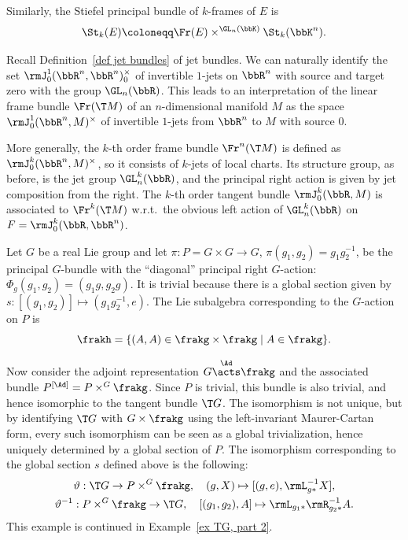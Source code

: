 \begin{example}
\begin{enumerate}
        Similarly, the Stiefel principal bundle of $k$-frames of $E$ is
        \[\St_k(E)\coloneqq \Fr(E)\times^{\GL_n(\bbK)}\St_k(\bbK^n).\]
    \end{enumerate}
\end{example}

\begin{example}
    Recall Definition~\ref{def jet bundles} of jet bundles. We can naturally identify the set $\rmJ^1_0(\bbR^n,\bbR^n)_0^\times$ of invertible $1$-jets on $\bbR^n$ with source and target zero with the group $\GL_n(\bbR)$. This leads to an interpretation of the linear frame bundle $\Fr(\T M)$ of an $n$-dimensional manifold $M$ as the space $\rmJ^1_0(\bbR^n,M)^\times$ of invertible $1$-jets from $\bbR^n$ to $M$ with source $0$.

    More generally, the $k$-th order frame bundle $\Fr^n(\T M)$ is defined as $\rmJ^k_0(\bbR^n,M)^\times$, so it consists of $k$-jets of local charts. Its structure group, as before, is the jet group $\GL^k_n(\bbR)$, and the principal right action is given by jet composition from the right. The $k$-th order tangent bundle $\rmJ^k_0(\bbR,M)$ is associated to $\Fr^k(\T M)$ w.r.t.\ the obvious left action of $\GL^k_n(\bbR)$ on $F=\rmJ^k_0(\bbR,\bbR^n)$.
\end{example}


\begin{example}\label{ex TG, part 1}
    Let $G$ be a real Lie group and let $\pi:P=G\times G\to G$, $\pi(g_1,g_2)=g_1g_2^{-1}$, be the principal $G$-bundle with the ``diagonal'' principal right $G$-action: $\Phi_g(g_1,g_2)=(g_1g,g_2g)$.  It is trivial because there is a global section given by $s:[(g_1,g_2)]\mapsto (g_1g_2^{-1},e)$. The Lie subalgebra corresponding to the $G$-action on $P$ is 
    \[\frakh=\{(A,A)\in \frakg\times\frakg\mid A\in\frakg\}.\]

    Now consider the adjoint representation $G\overset{\Ad}{\acts}\frakg$ and the associated bundle $P^{[\Ad]}=P\times^G \frakg$. Since $P$ is trivial, this bundle is also trivial, and hence isomorphic to the tangent bundle $\T G$. The isomorphism is not unique, but by identifying $\T G$ with $G\times\frakg$ using the left-invariant Maurer-Cartan form, every such isomorphism can be seen as a global trivialization, hence uniquely determined by a global section of $P$. The isomorphism corresponding to the global section $s$ defined above is the following:
    \begin{gather}
    	\vartheta: \T G\to P \times^G \frakg,\quad (g,X)\mapsto [(g,e),\rmL_{g\ast}^{-1}X],\\
    	\vartheta^{-1}: P\times^G \frakg\to \T G,\quad [(g_1,g_2),A]\mapsto \rmL_{g_1\ast}\rmR_{g_2\ast}^{-1}  A.
    \end{gather}
    This example is continued in Example~\ref{ex TG, part 2}.
\end{example}


